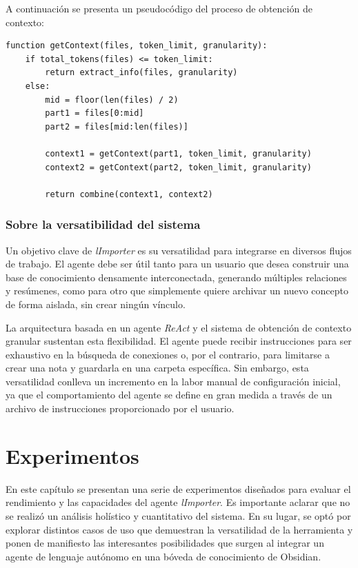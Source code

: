 A continuación se presenta un pseudocódigo del proceso de obtención de contexto:

\begin{verbatim}
function getContext(files, token_limit, granularity):
    if total_tokens(files) <= token_limit:
        return extract_info(files, granularity)
    else:
        mid = floor(len(files) / 2)
        part1 = files[0:mid]
        part2 = files[mid:len(files)]
        
        context1 = getContext(part1, token_limit, granularity)
        context2 = getContext(part2, token_limit, granularity)
        
        return combine(context1, context2)
\end{verbatim}

\subsection{Sobre la versatibilidad del sistema}
Un objetivo clave de \textit{lImporter} es su versatilidad para integrarse en diversos flujos de trabajo. El agente debe ser útil tanto para un usuario que desea construir una base de conocimiento densamente interconectada, generando múltiples relaciones y resúmenes, como para otro que simplemente quiere archivar un nuevo concepto de forma aislada, sin crear ningún vínculo.

La arquitectura basada en un agente \textit{ReAct} y el sistema de obtención de contexto granular sustentan esta flexibilidad. El agente puede recibir instrucciones para ser exhaustivo en la búsqueda de conexiones o, por el contrario, para limitarse a crear una nota y guardarla en una carpeta específica. Sin embargo, esta versatilidad conlleva un incremento en la labor manual de configuración inicial, ya que el comportamiento del agente se define en gran medida a través de un archivo de instrucciones proporcionado por el usuario.

\chapter{Experimentos}\label{chapter:implementation}
En este capítulo se presentan una serie de experimentos diseñados para evaluar el rendimiento y las capacidades del agente \textit{lImporter}. Es importante aclarar que no se realizó un análisis holístico y cuantitativo del sistema. En su lugar, se optó por explorar distintos casos de uso que demuestran la versatilidad de la herramienta y ponen de manifiesto las interesantes posibilidades que surgen al integrar un agente de lenguaje autónomo en una bóveda de conocimiento de Obsidian.


